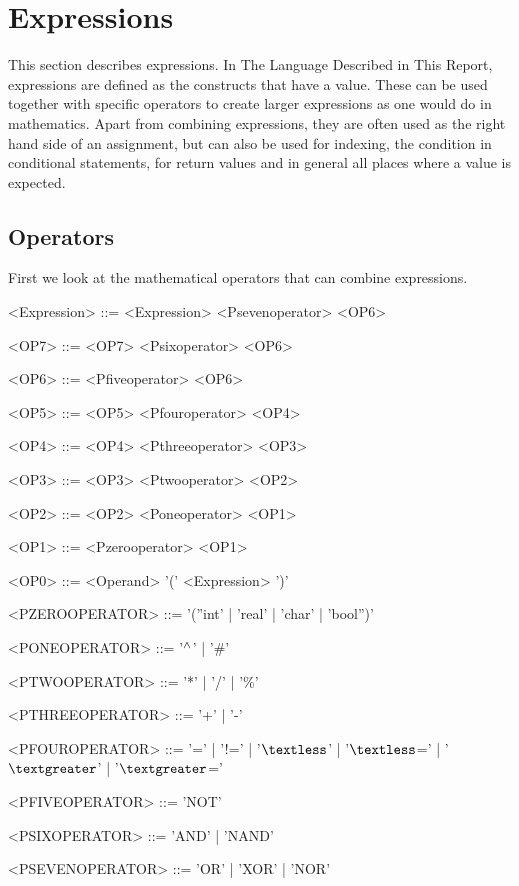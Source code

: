 \section{Expressions}
\label{sec:Expressions}
This section describes expressions. In The Language Described in This Report, expressions are defined as the constructs that have a value. These can be used together with specific operators to create larger expressions as one would do in mathematics. Apart from combining expressions, they are often used as the right hand side of an assignment, but can also be used for indexing, the condition in conditional statements, for return values and in general all places where a value is expected.

\subsection{Operators}\label{subsec:operators}
First we look at the mathematical operators that can combine expressions.
\setlength{\grammarindent}{100pt}
\begin{grammar}
<Expression> ::= <Expression> <Psevenoperator> <OP6>

<OP7> ::= <OP7> <Psixoperator> <OP6>

<OP6> ::= <Pfiveoperator> <OP6>

<OP5> ::= <OP5> <Pfouroperator> <OP4>

<OP4> ::= <OP4> <Pthreeoperator> <OP3>

<OP3> ::= <OP3> <Ptwooperator> <OP2>

<OP2> ::= <OP2> <Poneoperator> <OP1>

<OP1> ::= <Pzerooperator> <OP1>

<OP0> ::= <Operand>
 \alt '(' <Expression> ')'

<PZEROOPERATOR> ::= '(''int' | 'real' | 'char' | 'bool'')'

<PONEOPERATOR> ::= '$\mathbin{^\wedge{}}$' | '\#'

<PTWOOPERATOR> ::= '*' | '/' | '\%'

<PTHREEOPERATOR> ::= '+' | '-'

<PFOUROPERATOR> ::= '=' | '!=' | '$\textless$' | '$\textless$=' | '$\textgreater$' | '$\textgreater$='

<PFIVEOPERATOR> ::= 'NOT'

<PSIXOPERATOR> ::= 'AND' | 'NAND'

<PSEVENOPERATOR> ::= 'OR' | 'XOR' | 'NOR'
\end{grammar}
